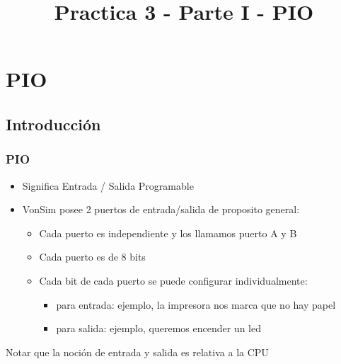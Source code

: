 \documentclass{beamer}
\title{Practica 3 - Parte I - PIO}
\begin{document}
\begin{frame}
\titlepage
\end{frame}

\section{PIO}
\subsection{Introducción}
\begin{frame}
\frametitle{PIO}
\begin{itemize}
 \item Significa Entrada / Salida Programable
 \item VonSim posee 2 puertos de entrada/salida de proposito general:
 \begin{itemize}
   \item Cada puerto es independiente y los llamamos puerto A y B
   \item Cada puerto es de 8 bits 
   \item Cada bit de cada puerto se puede configurar individualmente:
   \begin{itemize}
     \item para entrada: ejemplo, la impresora nos marca que no hay papel
     \item para salida: ejemplo, queremos encender un led
   \end{itemize}
 \end{itemize}
\end{itemize}
\begin{block}{}
Notar que la noción de entrada y salida es relativa a la CPU
\end{block}
\end{frame}
\end{document}
